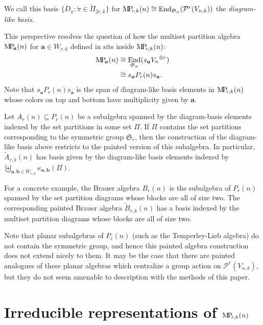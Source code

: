 \documentclass[ALCO,Unicode,published]{cedram}
\newcommand{\PP}{\mathcal{P}}
\newcommand{\SG}{\mathfrak{S}}
\newcommand{\bfa}{{\boldsymbol{a}}}
\newcommand{\bfb}{{\boldsymbol{b}}}
\newcommand{\MP}{{\rm M\!P\!}}
\newcommand{\tpi}{{\tilde{\pi}}}
\newcommand{\defn}[1]{\textcolor{defncolor}{\emph{#1}}}
\DeclareMathOperator{\End}{End}
\begin{document}
We call this basis $\{D_\tpi:\tpi\in\tilde{\Pi}_{2r,k}\}$ for $\MP_{r,k}(n)\cong\End_{\SG_n}(\PP^r(V_{n,k}))$ the \defn{diagram-like basis}.

\begin{rema} This perspective resolves the question of how the multiset partition algebra $\MP_\bfa(n)$ for $\bfa\in W_{r,k}$ defined in \cite{narayanan} sits inside $\MP_{r,k}(n)$:\begin{align*}
    \MP_{\bfa}(n)&\cong\End_{\SG_n}(s_\bfa {V_n}^{\otimes r})\\
    &\cong s_\bfa P_r(n) s_\bfa.
\end{align*} Note that $s_\bfa P_r(n) s_\bfa$ is the span of diagram-like basis elements in $\MP_{r,k}(n)$ whose colors on top and bottom have multiplicity given by $\bfa$.
\end{rema}

\begin{rema}\label{rem:other_subalgebras}
    Let $A_r(n)\subseteq P_r(n)$ be a subalgebra spanned by the diagram-basis elements indexed by the set partitions in some set $\Pi$. If $\Pi$ contains the set partitions corresponding to the symmetric group $\SG_r$, then the construction of the diagram-like basis above restricts to the painted version of this subalgebra. In particular, $\tilde{A}_{r,k}(n)$ has basis given by the diagram-like basis elements indexed by $\biguplus_{\bfa,\bfb\in W_{r,k}}\kappa_{\bfa,\bfb}(\Pi)$.

    For a concrete example, the Brauer algebra $B_r(n)$ is the subalgebra of $P_r(n)$ spanned by the set partition diagrams whose blocks are all of size two. The corresponding painted Brauer algebra $\tilde{B}_{r,k}(n)$ has a basis indexed by the multiset partition diagrams whose blocks are all of size two.

    Note that planar subalgebras of $P_r(n)$ (such as the Temperley-Lieb algebra) do not contain the symmetric group, and hence this painted algebra construction does not extend nicely to them. It may be the case that there are painted analogues of these planar algebras which centralize a group action on $\PP^r(V_{n,k})$, but they do not seem amenable to description with the methods of this paper.
\end{rema}

\section{Irreducible representations of \texorpdfstring{$\MP_{r,k}(n)$}{MP\_r,k(n)}}\label{sec:reps}
\end{document}
